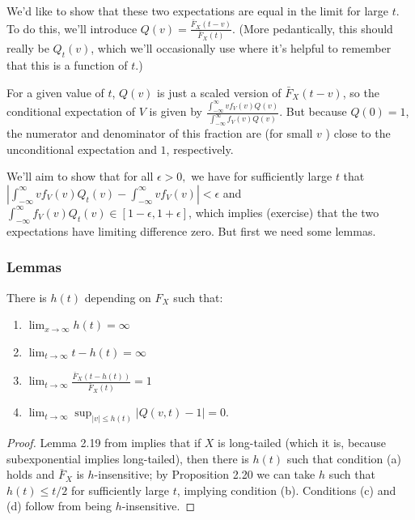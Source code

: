 \documentclass[../neurips_2024.tex]{subfiles}
\begin{document}
We'd like to show that these two expectations are equal in the limit for large \(t\). To do this, we'll introduce \(Q(v)=\frac{\bar{F}_X(t-v)}{\bar{F}_X(t)}\). (More pedantically, this should really be \(Q_t(v)\), which we'll occasionally use where it's helpful to remember that this is a function of \(t\).)

For a given value of \(t\), \(Q(v)\) is just a scaled version of \(\bar{F}_X(t-v)\), so the conditional expectation of \(V\) is given by \(\frac{\int_{-\infty}^\infty vf_V(v)Q(v)} {\int_{-\infty}^\infty f_V(v)Q(v)}\). But because \(Q(0)=1\), the numerator and denominator of this fraction are (for small \(v\) ) close to the unconditional expectation and \(1\), respectively.

We'll aim to show that for all \(\epsilon>0,\) we have for sufficiently large \(t\) that \(\left|\int_{-\infty}^\infty vf_V(v)Q_t(v) - \int_{-\infty}^\infty vf_V(v)\right|<\epsilon\) and \(\int_{-\infty}^\infty f_V(v)Q_t(v) \in [1-\epsilon,1+\epsilon]\), which implies (exercise) that the two expectations have limiting difference zero. But first we need some lemmas.

\subsubsection{Lemmas}

\begin{lemma}
 There is \(h(t)\) depending on \(F_X\) such that:
\begin{enumerate}[label=(\alph*)]
    \item \(\lim_{x\to\infty} h(t)=\infty\)
    \item \(\lim_{t \to\infty} t - h(t) = \infty\)
    \item \(\lim_{t\to\infty}\frac{\bar F_X(t-h(t))}{\bar F_X(t)}=1\)
    \item \(\lim_{t \to \infty} \sup_{|v| \le h(t)} |Q(v,t)-1| = 0\).
\end{enumerate}
\end{lemma}

\begin{proof}
 Lemma 2.19 from \citep{foss2013introduction} implies that if \(X\) is long-tailed (which it is, because subexponential implies long-tailed), then there is \(h(t)\) such that condition (a) holds and \(\bar F_X\) is \(h\)-insensitive; by Proposition 2.20 we can take \(h\) such that \(h(t) \le t/2\) for sufficiently large \(t\), implying condition (b). Conditions (c) and (d) follow from being \(h\)-insensitive.
 \end{proof}
\end{document}

